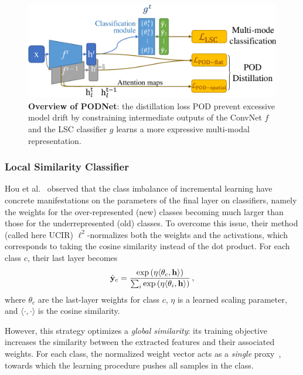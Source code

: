 \begin{figure}[t]
    \begin{center}
        \includegraphics[width=0.8\linewidth]{images/podnet/model}
    \end{center}
    \caption{\textbf{Overview of PODNet}: the distillation loss POD prevent excessive model drift by
        constraining intermediate outputs of the ConvNet $f$ and the LSC classifier $g$ learns a
        more expressive multi-modal representation.}
    \label{fig:model}
\end{figure}

\subsubsection{Local Similarity Classifier}
\label{sec:local_classifier}

Hou et al.~\cite{hou2019ucir} observed that the class imbalance of incremental learning have
concrete manifestations on the parameters of the final layer on classifiers, namely the weights for
the over-represented (new) classes becoming much larger than those for the underrepresented (old)
classes. To overcome this issue, their method (called here UCIR) $\ell^2$-normalizes both the
weights and the activations, which corresponds to taking the cosine similarity instead of the dot
product. For each class $c$, their last layer becomes
%
\begin{equation}
    \hat{\mathbf{y}}_{c}=\frac{\exp\left(\eta\langle\theta_{c},\mathbf{h}\rangle\right)}{\sum_{i} \exp \left(\eta\langle\theta_{i}, \mathbf{h}\rangle\right)}\,,
\end{equation}
%
where $\theta_c$ are the last-layer weights for class $c$, $\eta$ is a learned scaling parameter,
and $\langle\cdot,\cdot\rangle$ is the cosine similarity.

However, this strategy optimizes a \textit{global similarity}: its training objective increases the
similarity between the extracted features and their associated weights. For each class, the
normalized weight vector acts as a \textit{single} proxy~\cite{attias2017proxynca}, towards which
the learning procedure pushes all samples in the class.

